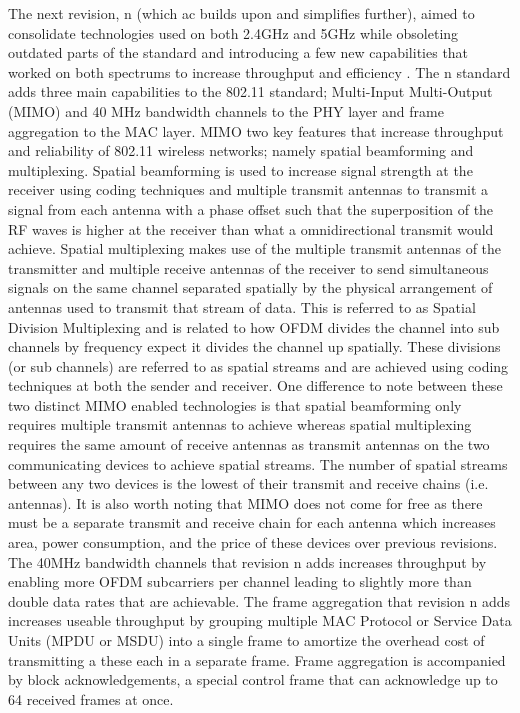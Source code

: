 The next revision, n (which ac builds upon and simplifies further), aimed to consolidate technologies used on both 2.4GHz and 5GHz while obsoleting outdated parts of the standard and introducing a few new capabilities that worked on both spectrums to increase throughput and efficiency \cite{ieee802n}. The n standard adds three main capabilities to the 802.11 standard; Multi-Input Multi-Output (MIMO) and 40 MHz bandwidth channels to the PHY layer and frame aggregation to the MAC layer. MIMO two key features that increase throughput and reliability of 802.11 wireless networks; namely spatial beamforming and multiplexing. Spatial beamforming is used to increase signal strength at the receiver using coding techniques and multiple transmit antennas to transmit a signal from each antenna with a phase offset such that the superposition of the RF waves is higher at the receiver than what a omnidirectional transmit would achieve. Spatial multiplexing makes use of the multiple transmit antennas of the transmitter and multiple receive antennas of the receiver to send  simultaneous signals on the same channel separated spatially by the physical arrangement of antennas used to transmit that stream of data. This is referred to as Spatial Division Multiplexing and is related to how OFDM divides the channel into sub channels by frequency expect it divides the channel up spatially. These divisions (or sub channels) are referred to as spatial streams and are achieved using coding techniques at both the sender and receiver. One difference to note between these two distinct MIMO enabled technologies is that spatial beamforming only requires multiple transmit antennas to achieve whereas spatial multiplexing requires the same amount of receive antennas as transmit antennas on the two communicating devices to achieve spatial streams. The number of spatial streams between any two devices is the lowest of their transmit and receive chains (i.e. antennas). It is also worth noting that MIMO does not come for free as there must be a separate transmit and receive chain for each antenna which increases area, power consumption, and the price of these devices over previous revisions. The 40MHz bandwidth channels that revision n adds increases throughput by enabling more OFDM subcarriers per channel leading to slightly more than double data rates that are achievable. The frame aggregation that revision n adds increases useable throughput by grouping multiple MAC Protocol or Service Data Units (MPDU or MSDU) into a single frame to amortize the overhead cost of transmitting a these each in a separate frame. Frame aggregation is accompanied by block acknowledgements, a special control frame that can acknowledge up to 64 received frames at once.

